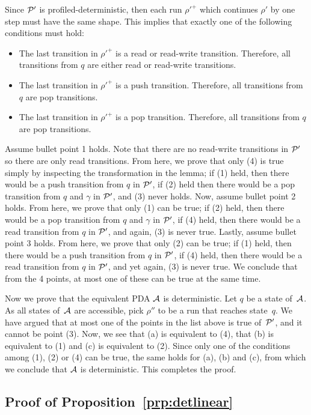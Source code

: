 Since $\mathcal{P}'$ is profiled-deterministic, then each run $\rho'^+$ which continues $\rho'$ by one step must have the same shape. This implies that exactly one of the following conditions must hold:
\begin{itemize}
	\item The last transition in $\rho'^+$ is a read or read-write transition. Therefore, all transitions from $q$ are either read or read-write transitions.
	\item The last transition in $\rho'^+$ is a push transition. Therefore, all transitions from $q$ are pop transitions.
	\item The last transition in $\rho'^+$ is a pop transition. Therefore, all transitions from $q$ are pop transitions.
\end{itemize}
 Assume bullet point 1 holds. Note that there are no read-write transitions in $\mathcal{P}'$ so there are only read transitions. From here, we prove that only (4) is true simply by inspecting the transformation in the lemma; if (1) held, then there would be a push transition from $q$ in $\mathcal{P}'$, if (2) held then there would be a pop transition from $q$ and $\gamma$ in $\mathcal{P}'$, and (3) never holds. Now, assume bullet point 2 holds. From here, we prove that only (1) can be true; if (2) held, then there would be a pop transition from $q$ and $\gamma$ in $\mathcal{P}'$, if (4) held, then there would be a read transition from $q$ in $\mathcal{P}'$, and again, (3) is never true. Lastly, assume bullet point 3 holds. From here, we prove that only (2) can be true; if (1) held, then there would be a push transition from $q$ in $\mathcal{P}'$, if (4) held, then there would be a read transition from $q$ in $\mathcal{P}'$, and yet again, (3) is never true. We conclude that from the 4 points, at most one of these can be true at the same time.

%
Now we prove that the equivalent PDA $\mathcal{A}$ is deterministic.
Let $q$ be a state of~$\mathcal{A}$. As all states of~$\mathcal{A}$ are accessible, pick $\rho''$ to be a run that reaches state~$q$. We have argued that at most one of the points in the list above is true of~$\mathcal{P}'$, and it cannot be point (3). Now,
we see that (a) is equivalent to (4), that (b) is equivalent to (1) and (c) is equivalent to (2). Since only one of the conditions among (1), (2) or (4) can be true, the same holds for (a), (b) and (c), from which we conclude that $\mathcal{A}$ is deterministic. This completes the proof.

\subsection{Proof of Proposition~\ref{prp:detlinear}}

